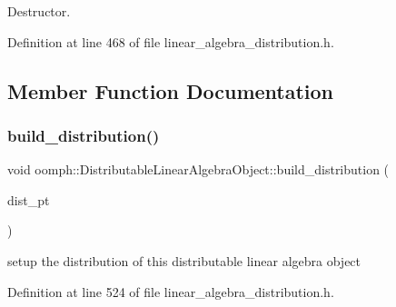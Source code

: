 Destructor. 



Definition at line 468 of file linear\+\_\+algebra\+\_\+distribution.\+h.



\subsection{Member Function Documentation}
\mbox{\label{classoomph_1_1DistributableLinearAlgebraObject_ac5340bac40b9559b0378037b57005203}} 
\subsubsection{\texorpdfstring{build\+\_\+distribution()}{build\_distribution()}\hspace{0.1cm}{\footnotesize\ttfamily [1/2]}}
{\footnotesize\ttfamily void oomph\+::\+Distributable\+Linear\+Algebra\+Object\+::build\+\_\+distribution (\begin{DoxyParamCaption}\item[{const \hyperlink{classoomph_1_1LinearAlgebraDistribution}{Linear\+Algebra\+Distribution} $\ast$const}]{dist\+\_\+pt }\end{DoxyParamCaption})\hspace{0.3cm}{\ttfamily [inline]}}



setup the distribution of this distributable linear algebra object 



Definition at line 524 of file linear\+\_\+algebra\+\_\+distribution.\+h.



